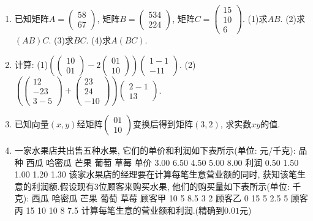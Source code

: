 \documentclass[10pt,a4paper]{article}
\begin{document}
\begin{enumerate}[1.]
\item 已知矩阵$A=\begin{pmatrix}
    5  8  \\6  7  \end{pmatrix}$, 矩阵$B=\begin{pmatrix}
    5  3  4  \\2  2  4  \end{pmatrix}$, 矩阵$C=\begin{pmatrix}
    15  \\10  \\6  \end{pmatrix}$.
(1)求$AB$. (2)求$(AB)C$.
(3)求$BC$. (4)求$A(BC)$.
\item 计算:
(1)$(\begin{pmatrix}
    1  0  \\0  1  \end{pmatrix}-2\begin{pmatrix}
    0  1  \\1  0  \end{pmatrix})\begin{pmatrix}
    1  -1  \\-1  1  \end{pmatrix}$.
(2)$(\begin{pmatrix}
    1  2  \\-2  3  \\3  -5  \end{pmatrix}+\begin{pmatrix}
    2  3  \\2  4  \\-1  0  \end{pmatrix})\begin{pmatrix}
    2  -1  \\1  3  \end{pmatrix}$.
\item 已知向量$(x,y)$经矩阵$\begin{pmatrix}
    0  1  \\1  0  \end{pmatrix}$变换后得到矩阵$(3,2)$, 求实数$xy$的值.
\item 一家水果店共出售五种水果, 它们的单价和利润如下表所示(单位: 元/千克):
品  种	西瓜	哈密瓜	芒果	葡萄	草莓
单价	3.00	6.50	4.50	5.00	8.00
利润	0.50	1.50	1.00	1.20	1.30
该家水果店的经理要在计算每笔生意营业额的同时, 获知该笔生意的利润额.假设现有$3$位顾客来购买水果, 他们的购买量如下表所示(单位: 千克):
西瓜	哈密瓜	芒果	葡萄	草莓
顾客甲	10	5	8.5	3	2
顾客乙	0	15	5	2.5	5
顾客丙	15	10	10	8	7.5
计算每笔生意的营业额和利润.(精确到$0.01$元)

\end{enumerate}
\end{document}
